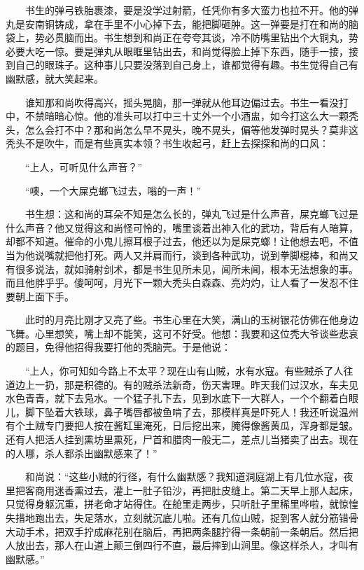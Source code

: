 　　书生的弹弓铁胎裹漆，要是没学过射箭，任凭你有多大蛮力也拉不开。他的弹丸是安南铜铸成，拿在手里不小心掉下去，能把脚砸肿。这一弹要是打在和尚的脑袋上，势必贯脑而出。书生想到和尚正在夸夸其谈，冷不防嘴里钻出个大铜丸，势必要大吃一惊。要是弹丸从眼眶里钻出去，和尚觉得脸上掉下东西，随手一接，接到自己的眼珠子。这种事儿只要没落到自己身上，谁都觉得有趣。书生觉得自己有幽默感，就大笑起来。 

　　谁知那和尚吹得高兴，摇头晃脑，那一弹就从他耳边偏过去。书生一看没打中，不禁暗暗心惊。他的准头可以打中三十丈外一个小酒盅，如今打这么大一颗秃头，怎么会打不中？那和尚怎么早不晃头，晚不晃头，偏等他发弹时晃头？莫非这秃头不是吹牛，而是有些真实本领？书生收起弓，赶上去探探和尚的口风： 

　　“上人，可听见什么声音？” 

　　“噢，一个大屎克螂飞过去，嗡的一声！” 

　　书生想：这和尚的耳朵不知是怎么长的，弹丸飞过是什么声音，屎克螂飞过是什么声音？他又觉得这和尚怪可怜的，嘴里谈着出神入化的武功，背后有人暗算，却都不知道。催命的小鬼儿擦耳根子过去，他还以为是屎克螂！让他想去吧，不值当为他说嘴就把他打死。两人又并肩而行，谈到各种武功，说到拳脚棍棒，和尚又有很多说法，就如骑射剑术，都是书生见所未见，闻所未闻，根本无法想象的事。而且他胖乎乎。傻呵呵，月光下一颗大秃头白森森、亮灼灼，让人看了一发忍不住要朝上面下手。 

　　此时的月亮比刚才又亮了些。书生心里在大笑，满山的玉树银花仿佛在他身边飞舞。心里想笑，嘴上却不能笑，这可不好受。他想：我要和这位秃大爷谈些悲哀的题目，免得他招得我要打他的秃脑壳。于是他说： 

　　“上人，你可知如今路上不太平？现在山有山贼，水有水寇。有些贼杀了人往道边上一扔，那是积德的。有的贼杀法新奇，伤天害理。昨天我们过汉水，车夫见水色青青，就下去凫水。一个猛子扎下去，见到水底下一大群人，一个个翻着白眼儿，脚下坠着大铁球，鼻子嘴唇都被鱼啃了去，那模样真是吓死人！我还听说温州有个土贼专门要把人按在酱缸里淹死，日后挖出来，腌得像酱黄瓜，浑身都是皱。还有人把活人挂到熏坊里熏死，尸首和腊肉一般无二，差点儿当猪卖了出去。现在的人哪，杀人都杀出幽默感来了！” 

　　和尚说：“这些小贼的行径，有什么幽默感？我知道洞庭湖上有几位水寇，夜里把客商用迷香熏过去，灌上一肚子铅沙，再把肚皮缝上。第二天早上那人起床，只觉得身躯沉重，拼老命才站得住。在舱里走两步，只听肚子里稀里哗啦，就惊惶失措地跑出去，失足落水，立刻就沉底儿啦。还有几位山贼，捉到客人就分筋错骨大动手术，把双手拧成麻花别在脑后，再把两条腿拧得一条朝前一条朝后。然后把人放出去，那人在山道上颠三倒四行不直，最后摔到山涧里。像这样杀人，才叫有幽默感。” 

